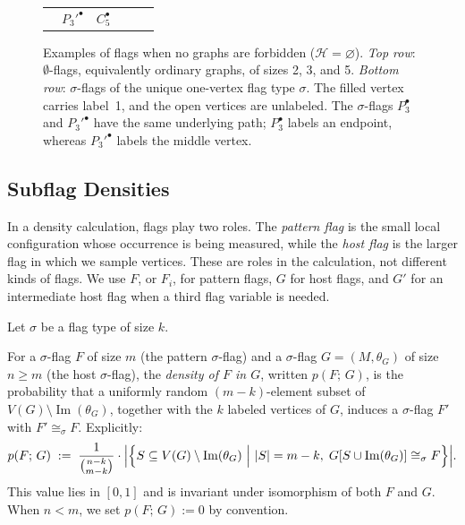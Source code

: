 \documentclass[acmsmall,screen=true,acmthm=false]{acmart}
\newcommand{\den}[2]{p(#1;\,#2)}
\newcommand{\boldparagraph}[1]{\noindentparagraph{\textnormal{\textbf{#1}}}}
\begin{document}
\begin{figure}[t]
\begin{tabular}{cccccc}
    & ${P_3'}^\bullet$ & $C_5^\bullet$ \\
  \end{tabular}
  \caption{Examples of flags when no graphs are forbidden
  ($\mathcal{H}=\varnothing$).  \emph{Top row}: $\emptyset$-flags, equivalently
  ordinary graphs, of sizes 2, 3, and 5.  \emph{Bottom row}: $\sigma$-flags of the
  unique one-vertex flag type $\sigma$.  The filled vertex carries label~1,
  and the open vertices are unlabeled.  The $\sigma$-flags $P_3^\bullet$ and
  ${P_3'}^\bullet$ have the same underlying path; $P_3^\bullet$ labels an
  endpoint, whereas ${P_3'}^\bullet$ labels the middle vertex.}
  \label{fig:flag-examples}
\end{figure}

\subsection{Subflag Densities}
\label{sec:background-densities}

In a density calculation, flags play two roles.  The \emph{pattern flag} is the
small local configuration whose occurrence is being measured, while the
\emph{host flag} is the larger flag in which we sample vertices.  These are
roles in the calculation, not different kinds of flags.  We use \(F\), or
\(F_i\), for pattern flags, \(G\) for host flags, and \(G'\) for an intermediate
host flag when a third flag variable is needed.

Let $\sigma$ be a flag type of size $k$.  

\boldparagraph{Single-flag density.}
For a $\sigma$-flag $F$ of size $m$
(the pattern $\sigma$-flag) and a $\sigma$-flag $G = (M, \theta_G)$ of size $n \geq m$
(the host $\sigma$-flag), the \emph{density of $F$ in $G$}, written $\den{F}{G}$, is
the probability that a uniformly random $(m-k)$-element subset of
$V(G) \setminus \operatorname{Im}(\theta_G)$, together with the $k$ labeled
vertices of $G$, induces a $\sigma$-flag \(F'\) with \(F' \cong_\sigma F\).
Explicitly:
\[
  \den{F}{G}
  \;:=\;
  \frac{1}{\binom{n-k}{m-k}}
    \cdot {\Bigl|\Big\{S \subseteq V(G)\setminus \operatorname{Im}(\theta_G)
                  ~\Big|~ |S|=m-k,\;
                  G[S \cup \operatorname{Im}(\theta_G)]
                  \cong_\sigma F \Big\}\Bigr|}.
\]
This value lies in $[0,1]$ and is invariant under
isomorphism of both $F$ and $G$.
When $n < m$, we set $\den{F}{G} := 0$ by convention.
\end{document}

